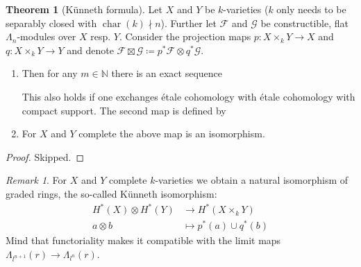 \documentclass[english]{scrartcl}
\theoremstyle{definition}
\newtheorem{Thm}[Def]{Theorem}
\theoremstyle{remark}
\newtheorem{Rem}[Def]{Remark}
\newcommand*{\N}{\mathds{N}}
\newcommand*{\Z}{\mathds{Z}}
\newcommand*{\Zmod}[1]{\Z/#1} %
\newcommand*{\F}{\mathcal{F}} %
\newcommand*{\G}{\mathcal{G}} %
\DeclareMathOperator{\Char}{char} %
\DeclareMathOperator{\Tor}{Tor} %
\begin{document}
\begin{Thm}[Künneth formula]\label{kuennethiso}
  Let $X$ and $Y$ be $k$-varieties
  ($k$ only needs to be separably closed with $\Char(k)\nmid n$).
  Further let $\F$ and $\G$ be constructible, flat $\Lambda_n$-modules
  over $X$ resp. $Y$.
  Consider the projection maps
  $p\colon X\times_k Y\to X$ and
  $q\colon X\times_k Y\to Y$ and denote
  $\F\boxtimes\G\coloneqq p^*\F\otimes q^*\G$. 
  \begin{enumerate}
  \item   Then for any $m\in\N$ there is an exact sequence
    \begin{center}
    \end{center}
    This also holds if one exchanges étale cohomology with étale
    cohomology with compact support.
    The second map is defined by
    \begin{center}
    \end{center}
  \item For $X$ and $Y$ complete the above map is an isomorphism. 
  \end{enumerate}
  \begin{proof}Skipped.\end{proof}
\end{Thm}

\begin{Rem}
  For $X$ and $Y$ complete $k$-varieties we obtain a natural
  isomorphism of graded rings, the so-called Künneth isomorphism:
  \begin{align*}
    H^*(X)\otimes H^*(Y) &\rightarrow H^*(X\times_k Y)\\
    a\otimes b &\mapsto p^*(a) \cup q^*(b)
  \end{align*}
  Mind that functoriality makes it compatible with the limit maps
  $\Lambda_{l^{n+1}}(r)\to\Lambda_{l^n}(r)$.
\end{Rem}
\end{document}
